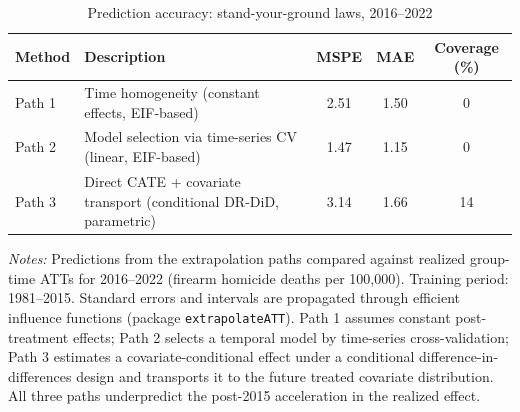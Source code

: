 \begin{table}[htbp]
\centering
\caption{Prediction accuracy: stand-your-ground laws, 2016--2022}
\label{tab:app_validation}
\begin{tabular}{lp{5.5cm}ccc}
\toprule
Method & Description & MSPE & MAE & Coverage (\%) \\
\midrule
Path 1 & Time homogeneity (constant effects, EIF-based) & 2.51 & 1.50 & 0 \\
Path 2 & Model selection via time-series CV (linear, EIF-based) & 1.47 & 1.15 & 0 \\
Path 3 & Direct CATE + covariate transport (conditional DR-DiD, parametric) & 3.14 & 1.66 & 14 \\
\bottomrule
\end{tabular}
\begin{minipage}{\textwidth}
\vspace{0.1in}\footnotesize
\textit{Notes:} Predictions from the extrapolation paths compared against realized
group-time ATTs for 2016--2022 (firearm homicide deaths per 100{,}000). Training period:
1981--2015. Standard errors and intervals are propagated through efficient influence
functions (package \texttt{extrapolateATT}). Path 1 assumes constant post-treatment
effects; Path 2 selects a temporal model by time-series cross-validation; Path 3
estimates a covariate-conditional effect under a conditional difference-in-differences
design and transports it to the future treated covariate distribution. All three paths
underpredict the post-2015 acceleration in the realized effect.
\end{minipage}
\end{table}
